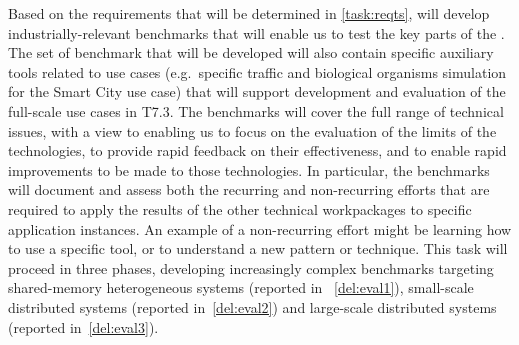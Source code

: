 \begin{Workpackage}{\thewpno}
\begin{Task}
Based on the requirements that will be determined in \ref{task:reqts}, \theTask{} will develop industrially-relevant benchmarks that will enable us to test the key parts of the \TheProject{}. The set of benchmark that will be 
developed will also contain specific auxiliary tools related to use cases (e.g.~specific traffic and biological organisms simulation for the Smart City use case) that will support development and evaluation of the 
full-scale use cases in T7.3. The benchmarks will cover the full range of technical issues, with a view to enabling us to focus on the evaluation of the limits of the \TheProject{} technologies, to provide rapid feedback on their effectiveness, and to enable rapid improvements to be made to those technologies. In particular, the benchmarks will document and assess both the recurring and non-recurring efforts that are required to apply the results of the other technical workpackages to specific application instances. 
An example of a non-recurring effort might be learning how to use a specific tool, or to understand a new pattern or technique. This task will proceed in three phases, developing increasingly complex benchmarks targeting shared-memory
heterogeneous systems (reported in ~\ref{del:eval1}), small-scale distributed systems (reported in~\ref{del:eval2}) and large-scale distributed systems (reported in~\ref{del:eval3}).
\end{Task}

\begin{Task}

\TaskHeader{}


\end{Task}
\end{Workpackage}
